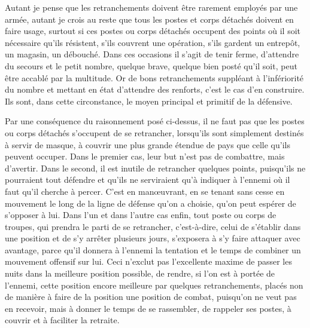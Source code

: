 \documentclass[french,twoside]{book} %
\begin{document}
Autant je pense que les retranchements doivent être rarement employés par une armée, autant je crois au reste que tous les postes et corps détachés doivent en faire usage, surtout si ces postes ou corps détachés occupent des points où il soit nécessaire qu’ils résistent, s’ils couvrent une opération, s’ils gardent un entrepôt, un magasin, un débouché. Dans ces occasions il s’agit de tenir ferme, d’attendre du secours et le petit nombre, quelque brave, quelque bien posté qu’il soit, peut être accablé par la multitude. Or de bons retranchements suppléant à l’infériorité du nombre et mettant en état d’attendre des renforts, c’est le cas d’en construire. Ils sont, dans cette circonstance, le moyen principal et primitif de la défensive.\par
Par une conséquence du raisonnement posé ci-dessus, il ne faut pas que les postes ou corps détachés s’occupent de se retrancher, lorsqu’ils sont simplement destinés à servir de masque, à couvrir une plus grande étendue de pays que celle qu’ils peuvent occuper. Dans le premier cas, leur but n’est pas de combattre, mais d’avertir. Dans le second, il est inutile de retrancher quelques points, puisqu’ils ne pourraient tout défendre et qu’ils ne serviraient qu’à indiquer à l’ennemi où il faut qu’il cherche à percer. C’est en manœuvrant, en se tenant sans cesse en mouvement le long de la ligne de défense qu’on a choisie, qu’on peut espérer de s’opposer à lui. Dans l’un et dans l’autre cas enfin, tout poste ou corps de troupes, qui prendra le parti de se retrancher, c’est-à-dire, celui de s’établir dans une position et de s’y arrêter plusieurs jours, s’exposera à s’y faire attaquer avec avantage, parce qu’il donnera à l’ennemi la tentation et le temps de combiner un mouvement offensif sur lui. Ceci n’exclut pas l’excellente maxime de passer les nuits dans la meilleure position possible, de rendre, si l’on est à portée de l’ennemi, cette position encore meilleure par quelques retranchements, placés non de manière à faire de la position une position de combat, puisqu’on ne veut pas en recevoir, mais à donner le temps de se rassembler, de rappeler ses postes, à couvrir et à faciliter la retraite.\par
\end{document}
